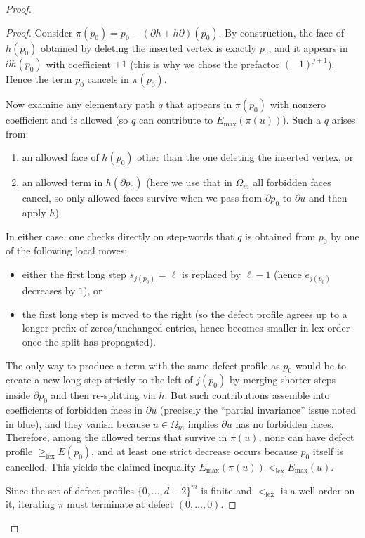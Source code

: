 \documentclass[10pt,a4paper]{amsart}
\begin{document}
\begin{proof}
\begin{proof}
Consider $\pi(p_0)=p_0-(\partial h+h\partial)(p_0)$.  By construction, the face of $h(p_0)$ obtained by deleting the inserted
vertex is exactly $p_0$, and it appears in $\partial h(p_0)$ with coefficient $+1$ (this is why we chose the prefactor
$(-1)^{j+1}$).  Hence the term $p_0$ cancels in $\pi(p_0)$.

Now examine any elementary path $q$ that appears in $\pi(p_0)$ with nonzero coefficient and is allowed
(so $q$ can contribute to $E_{\max}(\pi(u))$).  Such a $q$ arises from:
\begin{enumerate}
\item an allowed face of $h(p_0)$ other than the one deleting the inserted vertex, or
\item an allowed term in $h(\partial p_0)$ (here we use that in $\Omega_m$ all forbidden faces cancel, so only allowed faces
      survive when we pass from $\partial p_0$ to $\partial u$ and then apply $h$).
\end{enumerate}
In either case, one checks directly on step-words that $q$ is obtained from $p_0$ by one of the following local moves:
\begin{itemize}
\item either the first long step $s_{j(p_0)}=\ell$ is replaced by $\ell-1$ (hence $e_{j(p_0)}$ decreases by $1$), or
\item the first long step is moved to the right (so the defect profile agrees up to a longer prefix of zeros/unchanged
      entries, hence becomes smaller in lex order once the split has propagated).
\end{itemize}
The only way to produce a term with the same defect profile as $p_0$ would be to create a new long step strictly
to the left of $j(p_0)$ by merging shorter steps inside $\partial p_0$ and then re-splitting via $h$.
But such contributions assemble into coefficients of forbidden faces in $\partial u$ (precisely the ``partial invariance''
issue noted in blue), and they vanish because $u\in\Omega_m$ implies $\partial u$ has no forbidden faces.
Therefore, among the allowed terms that survive in $\pi(u)$, none can have defect profile $\ge_{\mathrm{lex}}E(p_0)$,
and at least one strict decrease occurs because $p_0$ itself is cancelled.  This yields the claimed inequality
$E_{\max}(\pi(u))<_{\mathrm{lex}}E_{\max}(u)$.

Since the set of defect profiles $\{0,\dots,d-2\}^m$ is finite and $<_{\mathrm{lex}}$ is a well-order on it,
iterating $\pi$ must terminate at defect $(0,\dots,0)$.
\end{proof}


\end{proof}
\end{document}
